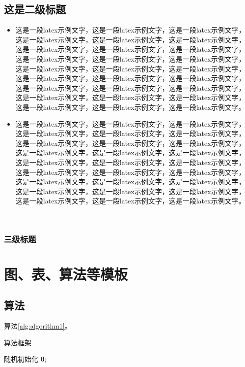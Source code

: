 \documentclass{template.cls} %
\begin{document}
\begin{multicols}{2}
        \subsection{这是二级标题}
        \begin{itemize}
        \item 这是一段latex示例文字\cite{reddy2013polypharmacology}，这是一段latex示例文字，这是一段latex示例文字，这是一段latex示例文字，这是一段latex示例文字，这是一段latex示例文字，这是一段latex示例文字，这是一段latex示例文字，这是一段latex示例文字，这是一段latex示例文字，这是一段latex示例文字，这是一段latex示例文字，这是一段latex示例文字，这是一段latex示例文字，这是一段latex示例文字，这是一段latex示例文字，这是一段latex示例文字，这是一段latex示例文字，这是一段latex示例文字，这是一段latex示例文字，这是一段latex示例文字，这是一段latex示例文字，这是一段latex示例文字，这是一段latex示例文字，这是一段latex示例文字，这是一段latex示例文字，这是一段latex示例文字。

        \item 这是一段latex示例文字\cite{reddy2013polypharmacology}，这是一段latex示例文字，这是一段latex示例文字，这是一段latex示例文字，这是一段latex示例文字，这是一段latex示例文字，这是一段latex示例文字，这是一段latex示例文字，这是一段latex示例文字，这是一段latex示例文字，这是一段latex示例文字，这是一段latex示例文字，这是一段latex示例文字，这是一段latex示例文字，这是一段latex示例文字，这是一段latex示例文字，这是一段latex示例文字，这是一段latex示例文字，这是一段latex示例文字，这是一段latex示例文字，这是一段latex示例文字，这是一段latex示例文字，这是一段latex示例文字，这是一段latex示例文字，这是一段latex示例文字，这是一段latex示例文字，这是一段latex示例文字。
        \end{itemize} 

        \subsubsection{三级标题}
        
        
    \section{图、表、算法等模板}

\subsection{算法}
算法\ref{alg:algorithm1}。 


\vspace{0.5em}
\begin{algorithm}[H]
	\caption{算法框架}
	\label{alg:algorithm1}
	\BlankLine
        随机初始化 $\bm{\theta}$;
        

\end{algorithm}
\end{multicols}
\end{document}
